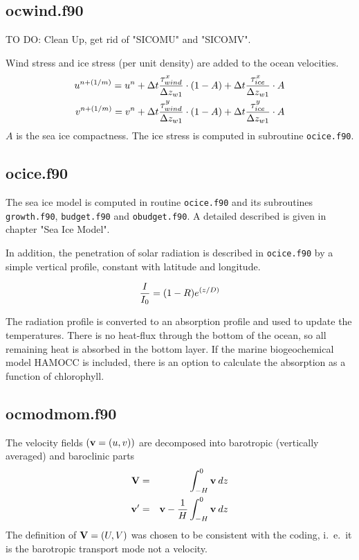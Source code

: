 \subsection{ocwind.f90}
\label{ch:timestepping:ocwind}

TO DO: Clean Up, get rid of "SICOMU" and "SICOMV".

Wind stress and ice stress (per unit density) are added to the ocean velocities.
\begin{eqnarray}
u^{n+(1/m)} = u^n + \Delta t {{\tau^{x}_{wind}}\over{\Delta z_{w1}}}\cdot(1-A) + \Delta t {{\tau^{x}_{ice}}\over{\Delta z_{w1}}}\cdot A \\
v^{n+(1/m)} = v^n + \Delta t {{\tau^{y}_{wind}}\over{\Delta z_{w1}}}\cdot(1-A) + \Delta t {{\tau^{y}_{ice}}\over{\Delta z_{w1}}}\cdot A 
\end{eqnarray}
$A$ is the sea ice compactness. The ice stress is computed in subroutine \texttt{ocice.f90}.


\subsection{ocice.f90}
\label{ch:timestepping:ocice}

The sea ice model is computed in routine \texttt{ocice.f90} and its subroutines \texttt{growth.f90}, 
\texttt{budget.f90} and \texttt{obudget.f90}. A detailed described is given in chapter "Sea Ice Model".

In addition, the penetration of solar radiation is described in \texttt{ocice.f90} by a simple vertical
profile, constant with latitude and longitude.

\begin{eqnarray}
{I\over{I_0}}=(1-R)e^{(z/D)}
\end{eqnarray}

The radiation profile is converted to an absorption profile and used to update the temperatures.
There is no heat-flux through the bottom of the ocean, so all remaining heat is absorbed in the bottom layer.
If the marine biogeochemical model HAMOCC is included, there is an option to calculate the absorption as a 
function of chlorophyll. 

\subsection{ocmodmom.f90}
\label{ch:timestepping:ocmodmom}

The velocity fields $({\bf v}=(u,v))$ are decomposed into barotropic
(vertically averaged) and baroclinic parts
\begin{eqnarray}
{\bf V}&=&\int_{-H}^0 {\bf v} \: dz \\
{\bf v}' &=& {\bf v} - {1\over H}\int_{-H}^0 {\bf v} \: dz
\end{eqnarray}
The definition of ${\bf V}=(U,V)$ was chosen to be consistent with the coding, i.\ e.\ it is
the barotropic transport mode not a velocity.

